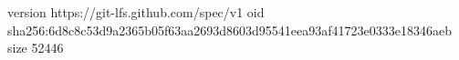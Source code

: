 version https://git-lfs.github.com/spec/v1
oid sha256:6d8c8c53d9a2365b05f63aa2693d8603d95541eea93af41723e0333e18346aeb
size 52446
